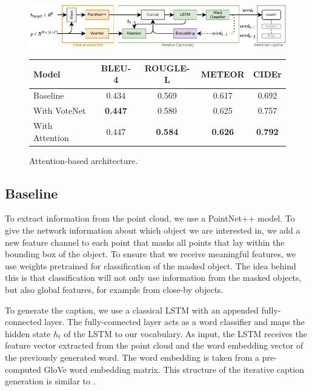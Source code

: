 \documentclass[10pt,twocolumn,letterpaper]{article}
\begin{document}
\begin{figure}	
	\centering
	\begin{minipage}[b]{.55\textwidth}
		\includegraphics[width=.95\textwidth]{figures/arch_condensed_2.pdf}
		\caption{Attention-based architecture.}
		\label{fig:arch}
	\end{minipage}
	\begin{minipage}[b]{.44\textwidth}
		{\scriptsize 
			\begin{tabular}{|l|cccc|}
			\hline
			\textbf{Model} & \textbf{BLEU-4} & \textbf{ROUGLE-L} & \textbf{METEOR} & \textbf{CIDEr}\\
			\hline
			Baseline & 0.434 & 0.569 & 0.617 & 0.692 \\
			With VoteNet & \textbf{0.447} & 0.580 & 0.625 & 0.757 \\
			With Attention & 0.447 & \textbf{0.584} & \textbf{0.626} & \textbf{0.792} \\
			\hline
		\end{tabular}}
		\vspace{.5\baselineskip}
		\label{tab:quantitative_results}
	\end{minipage}
\end{figure}

\subsection{Baseline}

To extract information from the point cloud, we use a PointNet++ \cite{qi2017pointnet++} model. To give the network information about which object we are interested in, we add a new feature channel to each point that masks all points that lay within the bounding box of the object. To ensure that we receive meaningful features, we use weights pretrained for classification of the masked object. The idea behind this is that classification will not only use information from the masked objects, but also global features, for example from close-by objects. 

To generate the caption, we use a classical LSTM with an appended fully-connected layer. The fully-connected layer acts as a word classifier and maps the hidden state $h_{t}$ of the LSTM to our vocabulary. As input, the LSTM receives the feature vector extracted from the point cloud and the word embedding vector of the previously generated word. The word embedding is taken from a pre-computed GloVe \cite{pennington2014glove} word embedding matrix. This structure of the iterative caption generation is similar to \cite{xu2015show}.
\end{document}
